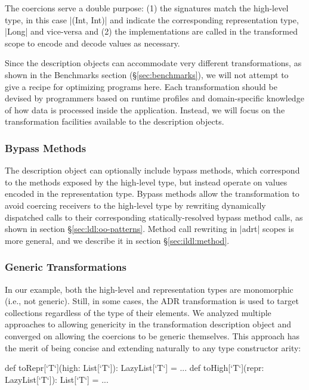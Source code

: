 The coercions serve a double purpose: (1) the signatures match the high-level type, in this case |(Int, Int)| and indicate the corresponding representation type, |Long| and vice-versa and (2) the implementations are called in the transformed scope to encode and decode values as necessary.

Since the description objects can accommodate very different transformations, as shown in the Benchmarks section (\S\ref{sec:benchmarks}), we will not attempt to give a recipe for optimizing programs here. Each transformation should be devised by programmers based on runtime profiles and domain-specific knowledge of how data is processed inside the application. Instead, we will focus on the transformation facilities available to the description objects.

\subsubsection*{Bypass Methods}

The description object can optionally include bypass methods, which correspond to the methods exposed by the high-level type, but instead operate on values encoded in the representation type. Bypass methods allow the transformation to avoid coercing receivers to the high-level type by rewriting dynamically dispatched calls to their corresponding statically-resolved bypass method calls, as shown in section \S\ref{sec:ldl:oo-patterns}. Method call rewriting in |adrt| scopes is more general, and we describe it   in section \S\ref{sec:ildl:method}.


\subsubsection*{Generic Transformations}

In our example, both the high-level and representation types are monomorphic (i.e., not generic). Still, in some cases, the ADR transformation is used to target collections regardless of the type of their elements. We analyzed multiple approaches to allowing genericity in the transformation description object and converged on allowing the coercions to be generic themselves. This approach has the merit of being concise and extending naturally to any type constructor arity:

\begin{lstlisting-nobreak}
  def toRepr[`T`](high: List[`T`]): LazyList[`T`] = ...
  def toHigh[`T`](repr: LazyList[`T`]): List[`T`] = ...
\end{lstlisting-nobreak}

